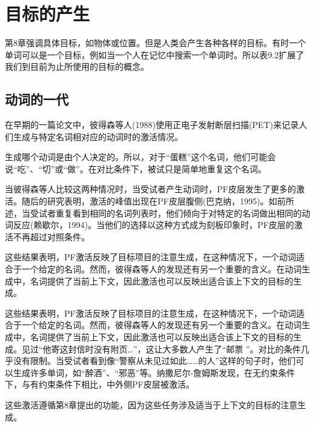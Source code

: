 \section{目标的产生}
\par
第8章强调具体目标，如物体或位置。但是人类会产生各种各样的目标。有时一个单词可以是一个目标，例如当一个人在记忆中搜索一个单词时。所以表9.2扩展了我们到目前为止所使用的目标的概念。
\subsection{动词的一代}
\par
在早期的一篇论文中，彼得森等人(1988)使用正电子发射断层扫描(PET)来记录人们生成与特定名词相对应的动词时的激活情况。
\par
生成哪个动词是由个人决定的。所以，对于“蛋糕”这个名词，他们可能会说“吃”、“切”或“做”。在对比条件下，被试只是简单地重复这个名词。
\par
当彼得森等人比较这两种情况时，当受试者产生动词时，PF皮层发生了更多的激活。随后的研究表明，激活的峰值出现在PF皮层腹侧(巴克纳，1995)。如前所述，当受试者重复看到相同的名词列表时，他们倾向于对特定的名词做出相同的动词反应(赖歇尔，1994)。当他们的选择以这种方式成为刻板印象时，PF皮层的激活不再超过对照条件。
\par
这些结果表明，PF激活反映了目标项目的注意生成，在这种情况下，一个动词适合于一个给定的名词。然而，彼得森等人的发现还有另一个重要的含义。在动词生成中，名词提供了当前上下文，因此激活也可以反映出适合该上下文的目标的生成。
\par
这些结果表明，PF激活反映了目标项目的注意生成，在这种情况下，一个动词适合于一个给定的名词。然而，彼得森等人的发现还有另一个重要的含义。在动词生成中，名词提供了当前上下文，因此激活也可以反映出适合该上下文的目标的生成。见过“他寄这封信时没有附页…”，这让大多数人产生了“邮票 ”。对比的条件几乎没有限制。当受试者看到像“警察从未见过如此……的人”这样的句子时，他们可以生成许多单词，如“醉酒”、“邪恶”等。纳撒尼尔-詹姆斯发现，在无约束条件下，与有约束条件下相比，中外侧PF皮层被激活。
\par
这些激活遵循第8章提出的功能，因为这些任务涉及适当于上下文的目标的注意生成。


